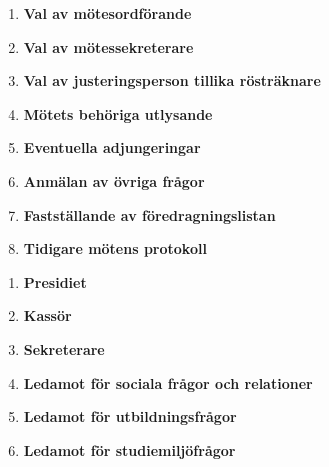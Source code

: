 \documentclass{dagordning}
\begin{document}


  \begin{enumerate}
    \item\textbf{Val av mötesordförande}
    \item\textbf{Val av mötessekreterare}
    \item\textbf{Val av justeringsperson tillika rösträknare}
    \item\textbf{Mötets behöriga utlysande}
    \item\textbf{Eventuella adjungeringar}
    \item\textbf{Anmälan av övriga frågor}
    \item\textbf{Fastställande av föredragningslistan}
    \item\textbf{Tidigare mötens protokoll}
  \end{enumerate}


  \begin{enumerate}
    \item \textbf{Presidiet}
    \item \textbf{Kassör}
    \item \textbf{Sekreterare}
    \item \textbf{Ledamot för sociala frågor och relationer}
    \item \textbf{Ledamot för utbildningsfrågor}
    \item \textbf{Ledamot för studiemiljöfrågor}
  \end{enumerate}










\end{document}
